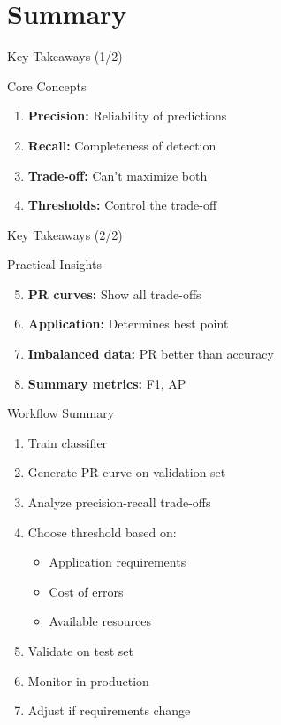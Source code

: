 \documentclass{beamer}
\begin{document}
\section{Summary}

\begin{frame}{Key Takeaways (1/2)}
\begin{keypointsbox}{Core Concepts}
\small
\begin{enumerate}
    \item \textbf{Precision:} Reliability of predictions
    \item \textbf{Recall:} Completeness of detection
    \item \textbf{Trade-off:} Can't maximize both
    \item \textbf{Thresholds:} Control the trade-off
\end{enumerate}
\end{keypointsbox}
\end{frame}

\begin{frame}{Key Takeaways (2/2)}
\begin{keypointsbox}{Practical Insights}
\small
\begin{enumerate}
    \setcounter{enumi}{4}
    \item \textbf{PR curves:} Show all trade-offs
    \item \textbf{Application:} Determines best point
    \item \textbf{Imbalanced data:} PR better than accuracy
    \item \textbf{Summary metrics:} F1, AP
\end{enumerate}
\end{keypointsbox}
\end{frame}

\begin{frame}{Workflow Summary}
\begin{enumerate}
    \item Train classifier
    \item Generate PR curve on validation set
    \item Analyze precision-recall trade-offs
    \item Choose threshold based on:
    \begin{itemize}
        \item Application requirements
        \item Cost of errors
        \item Available resources
    \end{itemize}
    \item Validate on test set
    \item Monitor in production
    \item Adjust if requirements change
\end{enumerate}
\end{frame}
\end{document}
